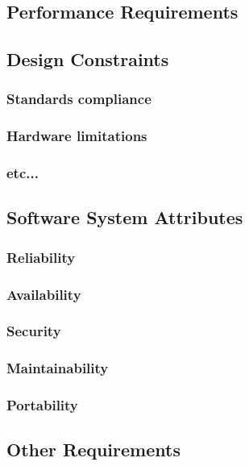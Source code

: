 \subsection{Performance Requirements} \label{sec:perf_requirements}

\subsection{Design Constraints} \label{sec:design_constr}

\subsubsection{Standards compliance} \label{std_compliance}

\subsubsection{Hardware limitations} \label{hw_limitations}

\subsubsection{etc...}

\subsection{Software System Attributes} \label{sec:sw_sys_attr}

\subsubsection{Reliability} \label{reliability}

\subsubsection{Availability} \label{availability}

\subsubsection{Security} \label{security}

\subsubsection{Maintainability} \label{maintainability}

\subsubsection{Portability} \label{portability}

\subsection{Other Requirements} \label{other}
